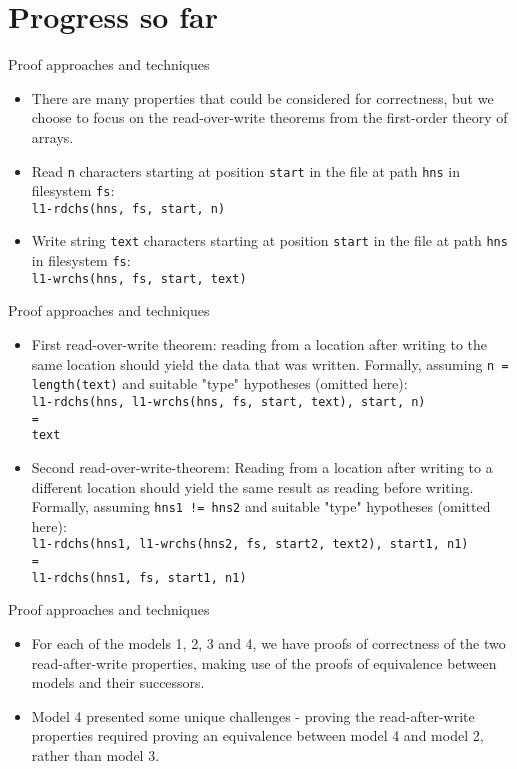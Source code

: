 \documentclass{beamer}
\begin{document}
\section{Progress so far}
\begin{frame}{Proof approaches and techniques}
  \begin{itemize}
  \item There are many properties that could be considered for
    correctness, but we choose to focus on the read-over-write
    theorems from the first-order theory of arrays.
  \item Read \texttt{n} characters starting at position \texttt{start}
    in the file at path \texttt{hns} in filesystem \texttt{fs}: \\
    \texttt{l1-rdchs(hns, fs, start, n)}
  \item Write string \texttt{text} characters starting at position \texttt{start}
    in the file at path \texttt{hns} in filesystem \texttt{fs}: \\
    \texttt{l1-wrchs(hns, fs, start, text)}
  \end{itemize}
\end{frame}
\begin{frame}{Proof approaches and techniques}
  \begin{itemize}
  \item First read-over-write theorem: reading from a location after writing to the same location
    should yield the data that was written. Formally, assuming \texttt{n =
      length(text)} and suitable "type" hypotheses (omitted here): \\
    \texttt{l1-rdchs(hns, l1-wrchs(hns, fs, start, text), start, n) \\
      = \\
      text}
  \item Second read-over-write-theorem: Reading from a location after writing to a different
    location should yield the same result as reading before
    writing. Formally, assuming \texttt{hns1 != hns2} and suitable "type"
    hypotheses (omitted here):\\
    \texttt{l1-rdchs(hns1, l1-wrchs(hns2, fs, start2, text2), start1, n1) \\
      = \\
      l1-rdchs(hns1, fs, start1, n1)}
  \end{itemize}
\end{frame}

\begin{frame}{Proof approaches and techniques}
  \begin{itemize}
  \item For each of the models 1, 2, 3 and 4, we have proofs of correctness of
    the two read-after-write properties, making use of the proofs of
    equivalence between models and their successors.
  \item Model 4 presented some unique challenges - proving the
    read-after-write properties required proving an equivalence
    between model 4 and model 2, rather than model 3.
  \end{itemize}
\end{frame}
\end{document}
